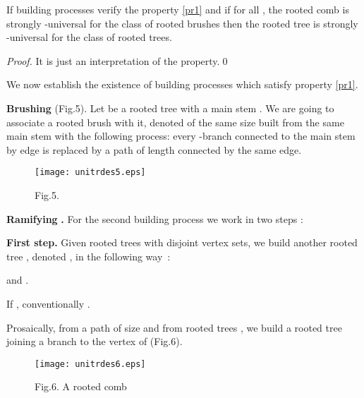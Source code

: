 \documentclass{llncs}
\begin{document}
\begin{lemma} If building processes verify the property \ref{pr1} and
if for all , the rooted comb  is strongly -universal
for the class of rooted brushes then the rooted tree  is strongly
-universal for the class of rooted trees.
\end{lemma}




\begin{proof}It is just an interpretation of the property.\qed
\end{proof}




We now establish the existence of building processes which satisfy
property \ref{pr1}.

\textbf{Brushing}  (Fig.5). Let  be a rooted tree with a
main stem . We are going to associate a rooted brush 
with it, denoted  of the same size
built from the same main stem  with the following
process: every -branch  connected to the main stem by
edge  is replaced by a path of length  connected by the same edge.

\begin{figure}[htbp]
\centerline{\texttt{[image: unitrdes5.eps]}}
\label{fig5}
\begin{center}
Fig.5.
\end{center}
\end{figure}


\textbf{Ramifying }\textbf{.} For the second building
process we work in two steps :





\textbf{First step.} Given rooted trees  with
disjoint vertex sets, we build another rooted tree , denoted
, in the following way~:











\noindent
and .

If , conventionally .


Prosaically, from a path  of size  and from  rooted trees , we
build a rooted tree joining a branch  to the vertex 
of  (Fig.6).

\begin{figure}[htbp]
\centerline{\texttt{[image: unitrdes6.eps]}}
\label{fig6}
\begin{center}
Fig.6. A rooted comb 
\end{center}
\end{figure}
\end{document}
